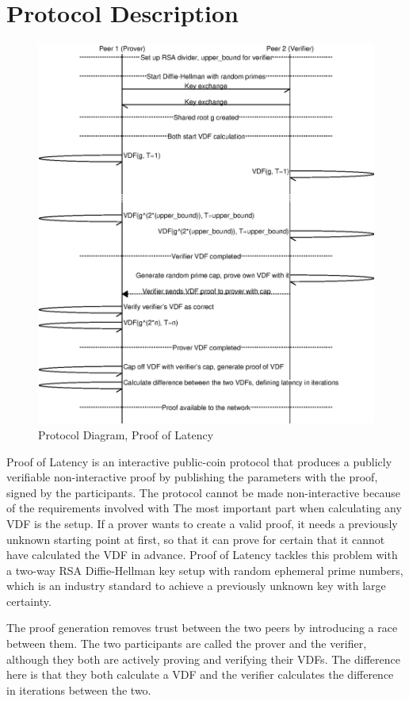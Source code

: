 \section{Protocol Description}
\begin{figure}
	\includegraphics[width=\textwidth]{pictures/pol2_diagram.eps}
	\caption{Protocol Diagram, Proof of Latency}
	\label{PoL Diagram 2}
\end{figure}
Proof of Latency is an interactive public-coin protocol that produces a publicly verifiable non-interactive proof by publishing the parameters with the proof, signed by the participants. The protocol cannot be made non-interactive because of the requirements involved with 
The most important part when calculating any VDF is the setup. If a prover wants to create a valid proof, it needs a previously unknown starting point at first, so that it can prove for certain that it cannot have calculated the VDF in advance. Proof of Latency tackles this problem with a two-way RSA Diffie-Hellman key setup with random ephemeral prime numbers, which is an industry standard to achieve a previously unknown key with large certainty. 

The proof generation removes trust between the two peers by introducing a race between them. The two participants are called the prover and the verifier, although they both are actively proving and verifying their VDFs. The difference here is that they both calculate a VDF and the verifier calculates the difference in iterations between the two.

